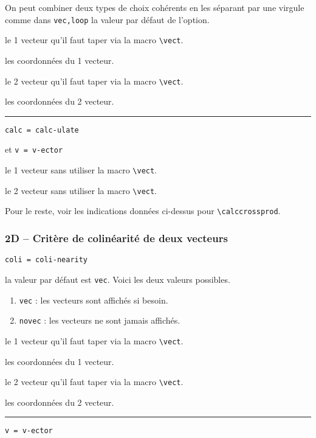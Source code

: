 \documentclass[12pt,a4paper]{article}
\theoremstyle{definition}
\newcommand\env[1]{\texttt{#1}}
\newcommand\macro[1]{\env{\textbackslash{}#1}}
\newcommand\separation{
    \medskip
    \hfill\rule{0.5\textwidth}{0.75pt}\hfill
    \medskip
}
\newcommand\mwhyprefix[2]{%
    \texttt{#1 = #1-#2}%
}
\begin{document}
            On peut combiner deux types de choix cohérents en les séparant par une virgule comme dans \verb+vec,loop+ la valeur par défaut de l'option.
            
            
 le 1\ier{} vecteur qu'il faut taper via la macro \macro{vect}.

 les coordonnées du 1\ier{} vecteur.

 le 2\ieme{} vecteur qu'il faut taper via la macro \macro{vect}.

 les coordonnées du 2\ieme{} vecteur.


\separation


  \hfill \mwhyprefix{calc}{ulate}
                                    et \mwhyprefix{v}{ector}

 le 1\ier{} vecteur sans utiliser la macro \macro{vect}.

 le 2\ieme{} vecteur sans utiliser la macro \macro{vect}.

\medskip

Pour le reste, voir les indications données ci-dessus pour \macro{calccrossprod}.


\subsubsection{2D -- Critère de colinéarité de deux vecteurs}



 \hfill \mwhyprefix{coli}{nearity}


\IDoption{} la valeur par défaut est \verb+vec+. Voici les deux valeurs possibles.
\begin{enumerate}
	\item \verb+vec+ : les vecteurs sont affichés si besoin.

	\item \verb+novec+ : les vecteurs ne sont jamais affichés.
\end{enumerate}


 le 1\ier{} vecteur qu'il faut taper via la macro \macro{vect}.

 les coordonnées du 1\ier{} vecteur.

 le 2\ieme{} vecteur qu'il faut taper via la macro \macro{vect}.

 les coordonnées du 2\ieme{} vecteur.


\separation


 \hfill \mwhyprefix{v}{ector}
\end{document}
